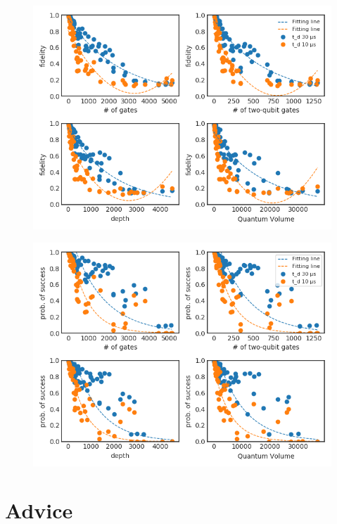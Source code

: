 \begin{figure}[htbp]
\centering
\includegraphics[width=\textwidth]{figures/f_metrics_correlation.png}
\caption{\label{fig:org59441c5}
}
\end{figure}

\begin{figure}[htbp]
\centering
\includegraphics[width=\textwidth]{figures/ps_metrics_correlation.png}
\caption{\label{fig:org75f0d0b}
}
\end{figure}

\section*{Advice}
\label{sec:org76f049f}
